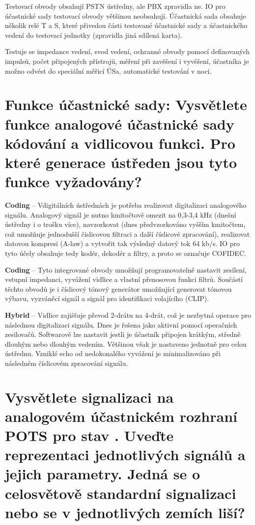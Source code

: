Testovací obvody obsahují PSTN ústředny, ale PBX zpravidla ne. IO pro účastnické sady testovací obvody většinou neobsahují. Účastnická sada obsahuje několik relé T a S, které přivedou části testované účastnické sady a účastnického vedení do testovací jednotky (zpravidla jiná sdílená karta).

Testuje se impedance vedení, svod vedení, ochranné obvody pomocí definovaných impulsů, počet připojených přístrojů, měření při zavěšení i vyvěšení, účastníka je možno odvést do speciální měřicí ÚSa, automatické testování v noci.

\section{Funkce účastnické sady: Vysvětlete funkce analogové účastnické sady kódování a vidlicovou funkci. Pro které generace ústředen jsou tyto funkce vyžadovány?}

\textbf{Coding} -- Vdigitálních ústřednách je potřeba realizovat digitalizaci analogového signálu. Analogový signál je nutno kmitočtově omezit na 0,3-3,4 kHz (dnešní ústředny i o trošku více), navzorkovat  (dnes předvzorkováno vyšším kmitočtem, což umožňuje jednodušší číslicovou filtraci a další číslicové zpracování), realizovat datovou kompresi (A-law) a vytvořit tak výsledný datový tok 64 kb/s. IO pro tyto účely obsahuje tedy kodér, dekodér a filtry, a proto se označuje COFIDEC.

\noindent\textbf{Coding} -- Tyto integrované obvody umožňují programovatelně nastavit zesílení, vstupní impedanci, vyvážení vidlice a vlastní přenosovou funkci filtrů. Součástí těchto obvodů je i číslicový tónový generátor umožňující generovat tónovou výbavu, vyzváněcí signál a signál pro identifikaci volajícího (CLIP).

\noindent\textbf{Hybrid} -- Vidlice zajišťuje převod 2-drátu na 4-drát, což je nezbytná operace pro následnou digitalizaci signálu. Dnes je řešena jako aktivní pomocí operačních zesilovačů. Softwarově lze nastavit jestli je účastník připojen krátkým, středně dlouhým nebo dlouhým vedením. Většinou však je nastaveno jednotně pro celou ústřednu. Vzniklé echo od nedokonalého vyvážení je minimalizováno při následném číslicovém zpracování signálu.

\section{Vysvětlete signalizaci na analogovém účastnickém rozhraní POTS pro stav . Uveďte reprezentaci jednotlivých signálů a jejich parametry. Jedná se o celosvětově standardní signalizaci nebo se v jednotlivých zemích liší?}

